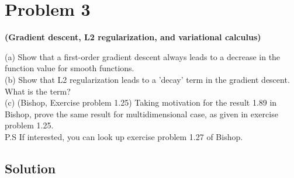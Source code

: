 \section*{Problem 3}

\textbf{(Gradient descent, L2 regularization, and variational calculus)}

(a) Show that a first-order gradient descent always leads to a decrease in the function value for smooth functions.\\
(b) Show that L2 regularization leads to a 'decay' term in the gradient descent. What is the term?\\
(c) (Bishop, Exercise problem 1.25) Taking motivation for the result 1.89 in Bishop, prove the same result for multidimensional case, as given in exercise problem 1.25.\\
P.S If interested, you can look up exercise problem 1.27 of Bishop.

\subsection*{Solution}
